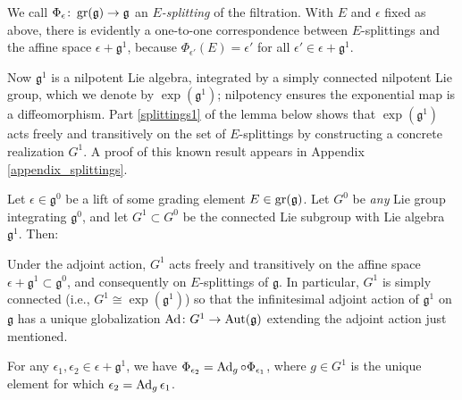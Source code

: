 \documentclass[leqno,12pt]{amsart} %
\begin{document}
We call $\Phi_\epsilon \colon \operatorname{\operatorname{gr}}({\mathfrak g}) \rightarrow {\mathfrak g} $ an {\em
  $E$-splitting} of the filtration. With $E$ and $\epsilon$ fixed as above, there is evidently a
one-to-one correspondence between $E$-splittings and the affine space
$\epsilon + {\mathfrak g}^1$, because $\Phi_{\epsilon'}(E) = \epsilon'$ for all $\epsilon' \in \epsilon + {\mathfrak g}^1$.

Now ${\mathfrak g}^1$ is a nilpotent Lie algebra, integrated by a simply connected
nilpotent Lie group, which we denote by $\exp({\mathfrak g}^1)$; nilpotency ensures the
exponential map is a diffeomorphism. Part \eqref{splittings1} of the lemma below shows
that $\exp({\mathfrak g}^1)$ acts freely and transitively on the set of $E$-splittings by
constructing a concrete realization $G^1$. A proof of this known result appears in
Appendix \ref{appendix_splittings}.
%
\begin{lemma}
  Let $\epsilon \in {\mathfrak g}^0 $ be a lift of some grading element
  $E \in \operatorname{\operatorname{gr}}({\mathfrak g})$. Let $G^0$ be {\em any} Lie group integrating
  ${\mathfrak g}^0 $, and let $G^1 \subset G^0$ be the connected Lie subgroup with Lie
  algebra ${\mathfrak g}^1$. Then:
  \begin{conditions}
  \item Under the adjoint action, $G^1$ acts freely and transitively on the affine space
    $\epsilon + {\mathfrak g}^1\subset {\mathfrak g}^0$, and consequently on $E$-splittings of
    ${\mathfrak g} $. In particular, $G^1$ is simply connected (i.e.,
    $G^1 \cong \exp({\mathfrak g}^1)$) so that the infinitesimal adjoint action of
    ${\mathfrak g}^1$ on ${\mathfrak g} $ has a unique globalization
    $\operatorname{Ad}\colon G^1 \rightarrow \operatorname{Aut}({\mathfrak g})$ extending the adjoint
    action just mentioned.\label{splittings1}
  \item For any $\epsilon_1, \epsilon_2 \in \epsilon + {\mathfrak g}^1$, we have
    $\Phi_{\epsilon_2} = \operatorname{Ad}_g\circ \Phi_{\epsilon_1}$, where $g \in G^1$ is the unique element for
    which $\epsilon_2 = \operatorname{Ad}_g \epsilon_1$. \label{splittings2}
  \end{conditions}
\end{lemma}
\end{document}
